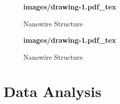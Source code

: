\begin{figure}[!htbp]
    \centering
    {\selectfont\textbf{
        \def\svgwidth{5.0cm}
        \fontsize{6}{7}\selectfont
         {images/drawing-1.pdf_tex}
    }}
    \fontsize{6}{7}\selectfont
    \caption{Nanowire Structure}
    \label{fig:tot1}
\end{figure}
\begin{figure}[!htbp]
    \centering
    {\selectfont\textbf{
        \def\svgwidth{5.0cm}
        \fontsize{6}{7}\selectfont
         {images/drawing-1.pdf_tex}
    }}
    \fontsize{6}{7}\selectfont
    \caption{Nanowire Structure}
    \label{fig:tot2}
\end{figure}






\section{Data Analysis}
